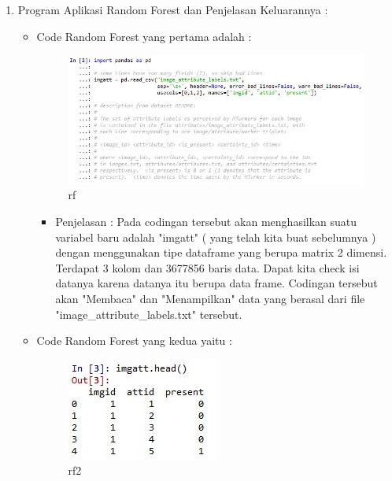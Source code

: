 \begin{enumerate}
\par
\par
\item Program Aplikasi Random Forest dan Penjelasan Keluarannya :
\begin{itemize}
\item Code Random Forest yang pertama adalah :
\par
\begin{figure}[ht]
\centering
\includegraphics[scale=0.2]{figures/rf.jpg}
\caption{rf }
\label{contoh}
\end{figure}
\par
\begin{itemize}
\item Penjelasan : Pada codingan tersebut akan menghasilkan suatu variabel baru adalah "imgatt" ( yang telah kita buat sebelumnya ) dengan menggunakan tipe dataframe yang berupa matrix 2 dimensi. Terdapat 3 kolom dan 3677856 baris data. Dapat kita check isi datanya karena datanya itu berupa data frame. Codingan tersebut akan  "Membaca" dan "Menampilkan" data yang berasal dari file "image\_attribute\_labels.txt" tersebut.
\par 
\par
\end{itemize}
\item Code Random Forest yang kedua yaitu :
\par
\begin{figure}[ht]
\centering
\includegraphics[scale=0.4]{figures/rfcahya2.jpg}
\caption{rf2}
\label{contoh}
\end{figure}
\par

\end{itemize}
\end{enumerate}
